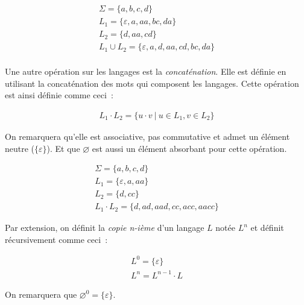 
\begin{example}
    \begin{gather*}
        \Sigma = \{a, b, c, d\} \\
        L_1 = \{\varepsilon, a, aa, bc, da\} \\
        L_2 = \{d, aa, cd\} \\
        L_1 \cup L_2 = \{\varepsilon, a, d, aa, cd, bc, da\} \\
    \end{gather*}
\end{example}

\begin{definition}
    Une autre opération sur les langages est la \textit{concaténation}. Elle
    est définie en utilisant la concaténation des mots qui composent les
    langages. Cette opération est ainsi définie comme ceci~:

    \begin{gather*}
        L_1 \cdot L_2 = \{u \cdot v ~|~ u \in L_1, v \in L_2\}
    \end{gather*}

    \noindent On remarquera qu'elle est associative, pas commutative et admet un
    élément neutre (\(\{\varepsilon\}\)). Et que \(\varnothing\) est aussi un
    élément absorbant pour cette opération.
\end{definition}

\begin{example}
    \begin{gather*}
        \Sigma = \{a, b, c, d\} \\
        L_1 = \{\varepsilon, a, aa\} \\
        L_2 = \{d, cc\} \\
        L_1 \cdot L_2 = \{d, ad, aad, cc, acc, aacc\}
    \end{gather*}
\end{example}

\begin{definition}
    Par extension, on définit la \textit{copie n-ième} d'un langage \(L\) notée
    \(L^n\) et définit récursivement comme ceci~:

    \begin{gather*}
        L^0 = \{\varepsilon\} \\
        L^n = L^{n - 1} \cdot L
    \end{gather*}

    \noindent On remarquera que \(\varnothing^0 = \{\varepsilon\}\).
\end{definition}

